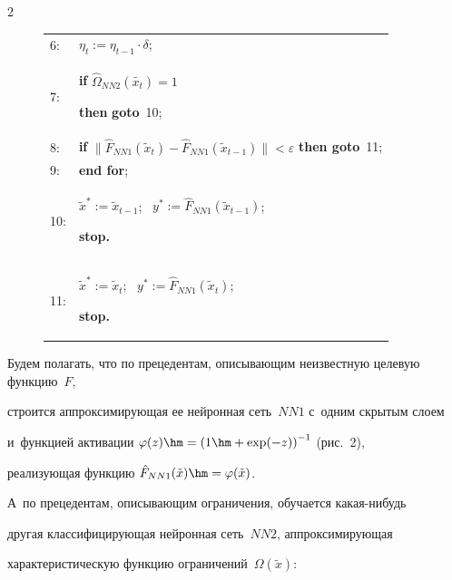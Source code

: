 \begin{multicols}{2}
\begin{figure}
{\begin{center}
\begin{tabular}{lp{130mm}}
\hphantom{9}6: &\hspace*{5mm}$\eta_t:=\eta_{t-1}\cdot \delta$;\\


\hphantom{9}7: &\hspace{5mm}\textbf{if} $\hat{\Omega}_{NN2}(\tilde{x_t})=1$ 


\textbf{then} \textbf{goto}~10;\\


\hphantom{9}8: &\hspace{5mm}\textbf{if} $\|\hat{F}_{NN1}(\tilde{x}_{t})


  - \hat{F}_{NN1}(\tilde{x}_{t-1})  \| < \varepsilon $ \textbf{then  goto}~11;\\


\hphantom{9}9: &\textbf{end for};\\


10: &$\tilde{x}^{*}:= \tilde{x}_{t-1}$; \ $y^{*}:=\hat{F}_{NN1}(\tilde{x}_{t-1})$; 


\textbf{stop.}\\


11: &$\tilde{x}^{*}:= \tilde{x}_t$; \ $y^{*}:=\hat{F}_{NN1}(\tilde{x}_t)$; 


\textbf{stop.}\\


\hline


\end{tabular}


\end{center}


}


\end{figure}





Будем полагать, что по прецедентам, описывающим неизвестную целевую функцию~$F$, 


строится аппроксимирующая ее нейронная сеть~$NN1$ с~одним скрытым слоем 


и~функцией активации  $\varphi(z)\hm=


\left(1\hm+\exp(-z)\right)^{-1}$ (рис.~2), 


реализующая функцию $\hat{F}_{NN1}(\tilde{x})\hm=\varphi(\tilde{x})$.  


А~по прецедентам, опи\-сы\-ва\-ющим ограничения, обучается ка\-кая-ни\-будь 


другая классифицирующая нейронная сеть~$NN2$, аппроксимирующая 


характеристическую функцию ограничений~$\Omega(\tilde{x})$:



\end{multicols}
